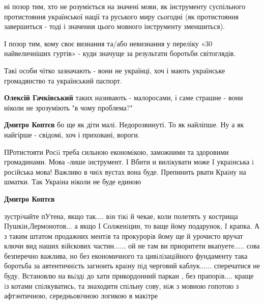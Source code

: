 \begin{itemize}
\begin{itemize}
ні позор тим, хто не розуміється на значені мови, як інструменту суспільного
протистояння української нації та руського миру сьогодні (як протистояння
завершиться - тоді і значення цього мовного інструменту зменшиться).

І позор тим, кому своє визнання та/або невизнання у переліку «30 найвеличніших
гуртів» - куди значуще за результати боротьби світоглядів.

Такі особи чітко зазначають - вони не українці, хоч і мають українське
громадянство та український паспорт.

\begin{itemize}
 
\textbf{Олексій Гачківський} таких називають - малоросами, і саме страшне - вони ніколи не зрозуміють "в чому проблема?"

 
\textbf{Дмитро Коптєв} бо ще як діти малі. Недорозвинуті.
То як найліпше.
Ну а як найгірше - свідомі, хоч і приховані, вороги.

 

ПРотистояти Росii треба сильною економiкою, заможними та здоровими громадинами.
Мова -лише iнструмент. I Вбити и вилiкувати може I украiнська i росiйська мова!
Важливо в чиiх вустах вона буде. Препинить рвати Краiну на шматки. Так Украiна
нiколи не буде единою


 
\textbf{Дмитро Коптєв} 

зустрiчайте пУтена, якщо так.... вiн тiкi й чекае, коли полетять у кострища
Пушкiн,Лермонотов... а якщо I Солженiцин, то ваще йому подарунок, I крапка. А з
таким штатом продажних ментiв та прокурорiв йому ще й урочисто вручат ключи вид
наших вiйскових частин...... ой не там ви приоритети вкапуете..... сова
безперечно важлива, но без економичного та цивiлiзацiйного фундаменту така
боротьба за автентичнiсть загноить краiну пiд черговий каблук...... сперечатися
не буду. Встановлю на вьiздi до хати прикордонний паркан , без прапорiв....
краще iз котами спiлкуватись, та знаходити спiльну сову, нiж з мовною гопотою з
афтэнтичною, середньовiчною логикою в макiтре


\end{itemize}
\end{itemize}
\end{itemize}
